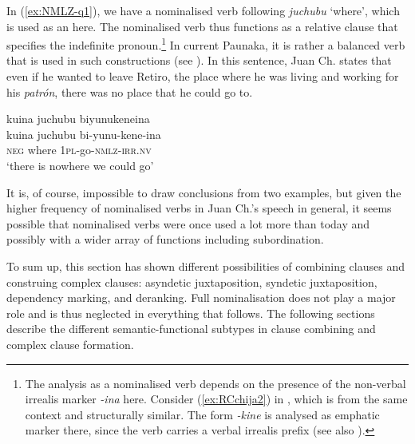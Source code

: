 In (\ref{ex:NMLZ-q1}), we have a nominalised verb following \textit{juchubu} ‘where’, which is used as an  here. The nominalised verb thus functions as a relative clause that specifies the indefinite pronoun.\footnote{The analysis as a nominalised verb depends on the presence of the non-verbal irrealis marker \textit{-ina} here. Consider (\ref{ex:RCchija2}) in , which is from the same context and structurally similar. The form \textit{-kine} is analysed as emphatic marker there, since the verb carries a verbal irrealis prefix (see also ).} In current Paunaka, it is rather a balanced verb that is used in such constructions (see ). In this sentence, Juan Ch. states that even if he wanted to leave Retiro, the place where he was living and working for his \textit{patrón}, there was no place that he could go to.

\ea\label{ex:NMLZ-q1}
\begingl
\glpreamble kuina juchubu biyunukeneina\\
\gla kuina juchubu bi-yunu-kene-ina\\
\glb \textsc{neg} where 1\textsc{pl}-go-\textsc{nmlz}-\textsc{irr.nv}\\
\glft ‘there is nowhere we could go’
\endgl
\trailingcitation{[nxx-p630101g-1.177]}
\xe

It is, of course, impossible to draw conclusions from two examples, but given the higher frequency of nominalised verbs in Juan Ch.’s speech in general, it seems possible that nominalised verbs were once used a lot more than today and possibly with a wider array of functions including subordination. 

To sum up, this section has shown different possibilities of combining clauses and construing complex clauses: asyndetic juxtaposition, syndetic juxtaposition, dependency marking, and deranking. Full nominalisation does not play a major role and is thus neglected in everything that follows. The following sections describe the different semantic-functional subtypes in clause combining and complex clause formation. 


